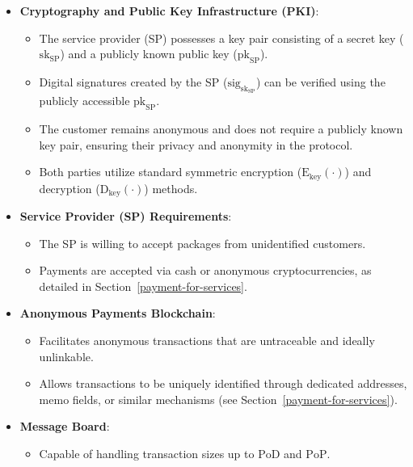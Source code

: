 \documentclass[pdftex,twocolumn,epjc3]{svjour3}
\begin{document}
{\begin{itemize}

\item \textbf{Cryptography and Public Key Infrastructure (PKI)}:
    \begin{itemize}
        \item The service provider (SP) possesses a key pair consisting of a secret key ($\mathrm{sk}_\mathrm{SP}$) and a publicly known public key ($\mathrm{pk}_\mathrm{SP}$).
        \item Digital signatures created by the SP ($\mathrm{sig}_{\mathrm{sk}_\mathrm{SP}}$) can be verified using the publicly accessible $\mathrm{pk}_\mathrm{SP}$.
        \item The customer remains anonymous and does not require a publicly known key pair, ensuring their privacy and anonymity in the protocol.
        
        \item Both parties utilize standard symmetric encryption ($\mathrm{E}_\mathrm{key}(\cdot)$) and decryption ($\mathrm{D}_\mathrm{key}(\cdot)$) methods.
    \end{itemize}

\item \textbf{Service Provider (SP) Requirements}:
    \begin{itemize}
        \item The SP is willing to accept packages from unidentified customers.
        \item Payments are accepted via cash or anonymous cryptocurrencies, as detailed in Section~\ref{payment-for-services}.
    \end{itemize}
    
\item \textbf{Anonymous Payments Blockchain}:
    \begin{itemize}
        \item Facilitates anonymous transactions that are untraceable and ideally unlinkable.
        \item Allows transactions to be uniquely identified through dedicated addresses, memo fields, or similar mechanisms (see Section~\ref{payment-for-services}).
    \end{itemize}

\item \textbf{Message Board}:
    \begin{itemize}
        \item Capable of handling transaction sizes up to $\mathrm{PoD}$ and $\mathrm{PoP}$.
    \end{itemize}


\end{itemize}}
\end{document}
